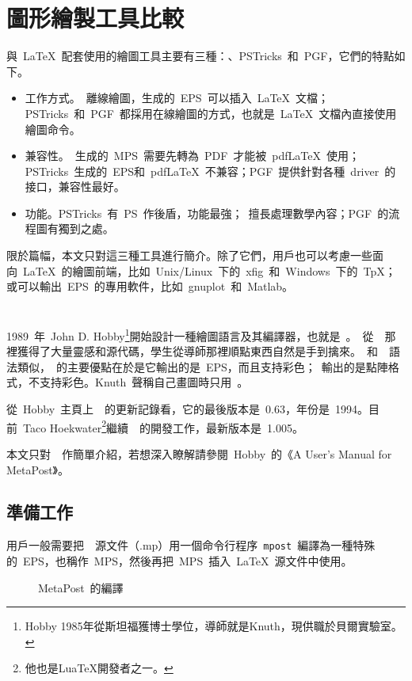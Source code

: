\section{圖形繪製工具比較}
與~\LaTeX~配套使用的繪圖工具主要有三種：\MP、PSTricks~和~PGF，它們的特點如下。

\begin{itemize}
\item 工作方式。\MP~離線繪圖，生成的~EPS~可以插入~\LaTeX~文檔；PSTricks~和~PGF~都採用在線繪圖的方式，也就是~\LaTeX~文檔內直接使用繪圖命令。
\item 兼容性。\MP~生成的~MPS~需要先轉為~PDF~才能被~pdf\LaTeX~使用；PSTricks~生成的~EPS和~pdf\LaTeX~不兼容；PGF~提供針對各種~driver~的接口，兼容性最好。
\item 功能。PSTricks~有~PS~作後盾，功能最強；\MP~擅長處理數學內容；PGF~的流程圖有獨到之處。
\end{itemize}

限於篇幅，本文只對這三種工具進行簡介。除了它們，用戶也可以考慮一些面向~\LaTeX~的繪圖前端，比如~Unix/Linux~下的~xfig~和~Windows~下的~TpX；或可以輸出~EPS~的專用軟件，比如~gnuplot~和~Matlab。

\section{\MP}
\label{sec:mp}

1989~年~John D. Hobby\footnote{Hobby 1985年從斯坦福獲博士學位，導師就是Knuth，現供職於貝爾實驗室。}開始設計一種繪圖語言及其編譯器，也就是~\MP。\MP~從~\MF~那裡獲得了大量靈感和源代碼，學生從導師那裡順點東西自然是手到擒來。\MP~和~\MF~語法類似，\MP~的主要優點在於是它輸出的是~EPS，而且支持彩色；\MF~輸出的是點陣格式，不支持彩色。Knuth~聲稱自己畫圖時只用~\MP。

從~Hobby~主頁上~\MP~的更新記錄看，它的最後版本是~0.63，年份是~1994。目前~Taco Hoekwater\footnote{他也是LuaTeX開發者之一。}繼續~\MP~的開發工作，最新版本是~1.005。

本文只對~\MP~作簡單介紹，若想深入瞭解請參閱~Hobby~的《A User's Manual for MetaPost》\citep{Hobby_2007}。

\subsection{準備工作}
用戶一般需要把~\MP~源文件（.mp）用一個命令行程序~\verb|mpost|~編譯為一種特殊的~EPS，也稱作~MPS，然後再把~MPS~插入~\LaTeX~源文件中使用。
\begin{figure}[htbp]
\centering
{}
\caption{MetaPost~的編譯}
\label{fig:mp}
\end{figure}

